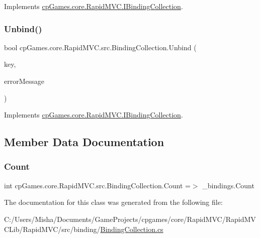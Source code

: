 Implements \mbox{\hyperlink{interfacecp_games_1_1core_1_1_rapid_m_v_c_1_1_i_binding_collection_a7c6b93ad95ca21419be73882d1156458}{cp\+Games.\+core.\+Rapid\+M\+V\+C.\+I\+Binding\+Collection}}.

\mbox{\label{classcp_games_1_1core_1_1_rapid_m_v_c_1_1src_1_1_binding_collection_a09aab47e05fb2aac72f9dbcb4797a6c2}} 
\subsubsection{\texorpdfstring{Unbind()}{Unbind()}}
{\footnotesize\ttfamily bool cp\+Games.\+core.\+Rapid\+M\+V\+C.\+src.\+Binding\+Collection.\+Unbind (\begin{DoxyParamCaption}\item[{\mbox{\hyperlink{interfacecp_games_1_1core_1_1_rapid_m_v_c_1_1_i_binding_key}{I\+Binding\+Key}}}]{key,  }\item[{out string}]{error\+Message }\end{DoxyParamCaption})}



Implements \mbox{\hyperlink{interfacecp_games_1_1core_1_1_rapid_m_v_c_1_1_i_binding_collection_ab20c12c64a91e24e7685780dd64f1d87}{cp\+Games.\+core.\+Rapid\+M\+V\+C.\+I\+Binding\+Collection}}.



\subsection{Member Data Documentation}
\mbox{\label{classcp_games_1_1core_1_1_rapid_m_v_c_1_1src_1_1_binding_collection_a5454192af90004d395e9e80a75adaf98}} 
\subsubsection{\texorpdfstring{Count}{Count}}
{\footnotesize\ttfamily int cp\+Games.\+core.\+Rapid\+M\+V\+C.\+src.\+Binding\+Collection.\+Count =$>$ \+\_\+bindings.\+Count}



The documentation for this class was generated from the following file\+:\begin{DoxyCompactItemize}
\item 
C\+:/\+Users/\+Misha/\+Documents/\+Game\+Projects/cpgames/core/\+Rapid\+M\+V\+C/\+Rapid\+M\+V\+C\+Lib/\+Rapid\+M\+V\+C/src/binding/\mbox{\hyperlink{_binding_collection_8cs}{Binding\+Collection.\+cs}}\end{DoxyCompactItemize}
